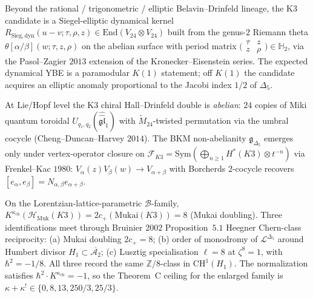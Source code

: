 \begin{remark}
\label{rem:ydk-R-sieg}
Beyond the rational / trigonometric / elliptic Belavin--Drinfeld
lineage, the K3 candidate is a Siegel-elliptic dynamical kernel
$R_{\mathrm{Sieg,dyn}}(u-v;\tau,\rho,z)
\in \mathrm{End}(V_{24}\otimes V_{24})$ built from the genus-$2$
Riemann theta
$\theta[\alpha/\beta](w;\tau,z,\rho)$ on the abelian surface with
period matrix
$\bigl(\begin{smallmatrix}\tau & z\\ z & \rho\end{smallmatrix}\bigr)
\in\mathbb{H}_2$, via the Pasol--Zagier $2013$ extension of the
Kronecker--Eisenstein series. The expected dynamical YBE is a
paramodular $K(1)$ statement; off $K(1)$ the candidate acquires an
elliptic anomaly proportional to the Jacobi index $1/2$ of $\Delta_5$.
\end{remark}

\begin{remark}
\label{rem:ydk-abelian-at-lie}
At Lie/Hopf level the K3 chiral Hall--Drinfeld double is \emph{abelian}: $24$ copies of Miki quantum toroidal $U_{q_1, q_2}(\widehat{\widehat{\mathfrak{gl}}}_1)$ with $\widetilde{M}_{24}$-twisted permutation via the umbral cocycle (Cheng--Duncan--Harvey $2014$). The BKM non-abelianity $\mathfrak{g}_{\Delta_5}$ emerges only under vertex-operator closure on $\mathcal{F}_{K3} = \mathrm{Sym}(\bigoplus_{n \ge 1} H^*(K3) \otimes t^{-n})$ via Frenkel--Kac $1980$: $V_\alpha(z) V_\beta(w) \to V_{\alpha+\beta}$ with Borcherds $2$-cocycle recovers $[e_\alpha, e_\beta] = N_{\alpha,\beta} e_{\alpha + \beta}$.
\end{remark}

\begin{remark}
\label{rem:ydk-three-faces}
On the Lorentzian-lattice-parametric $\mathcal{B}$-family,
$K^{\kappa_{\mathrm{ch}}}(\mathcal{H}_{\mathrm{Muk}}(K3))
=2c_+(\mathrm{Mukai}(K3))=8$ (Mukai doubling). Three identifications
meet through Bruinier $2002$ Proposition~$5.1$ Heegner Chern-class
reciprocity:
(a) Mukai doubling $2 c_+ = 8$;
(b) order of monodromy of $\mathcal{L}^{\Delta_5}$ around Humbert divisor $H_1 \subset \overline{\mathcal{A}_2}$;
(c) Lusztig specialisation $\ell = 8$ at $\zeta^8 = 1$, with $\hbar^2 = -1/8$.
All three record the same $\mathbb{Z}/8$-class in
$\mathrm{CH}^1(H_1)$. The normalization satisfies
$\hbar^2\cdot K^{\kappa_{\mathrm{ch}}}=-1$, so the Theorem~C ceiling
for the enlarged family is
$\kappa+\kappa^!\in\{0,8,13,250/3,25/3\}$.
\end{remark}

